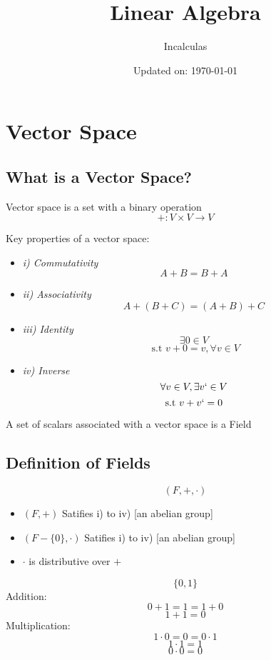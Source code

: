 \documentclass[11pt,a4paper]{colorart}
\title{\huge Linear Algebra}
\author{Incalculas}
\date{Updated on: \today}
\def\l{\left}
\def\r{\right}
\begin{document}
\maketitle
\tableofcontents
\newpage

\section{Vector Space}

\subsection{What is a Vector Space?}

Vector space is a set with a binary operation
	\[ +: V \times V \rightarrow V \]

Key properties of a vector space:

\begin{itemize}
	\item \textit{i) Commutativity}
			\[A + B = B + A \]
	\item \textit{ii) Associativity}
			\[ A + \l(B + C\r) = \l(A + B \r) + C\]
	\item \textit{iii) Identity}
		\[ \exists 0 \in V \]
		\[ \text{ s.t } v + 0 = v, \forall v \in V \]
	\item \textit{iv) Inverse}
		\[ \forall v \in V, \exists v` \in V \]
		\[ \text{s.t } v + v` = 0 \]
\end{itemize}

A set of scalars associated with a vector space is a Field \\

\subsection{Definition of Fields}

\begin{definition}[Fields]
	\[ \l(F, +, \cdot\r) \]
	\begin{itemize}
		\item $\l(F, +\r)$ Satifies i) to iv) [an abelian group]
		\item $\l(F -\{0\} , \cdot\r)$ Satifies i) to iv) [an abelian group]
		\item $\cdot$ is distributive over $+$
	\end{itemize}
\end{definition}

\begin{example}
	\[ \{0,1\} \]
	Addition:
	\[ 0 + 1 = 1 = 1 + 0 \]
	\[ 1 + 1 = 0 \]
	Multiplication:
	\[ 1 \cdot 0 = 0 = 0 \cdot 1\]
	\[ 1 \cdot 1 = 1 \]
	\[ 0 \cdot 0 = 0 \]
\end{example}
\end{document}
